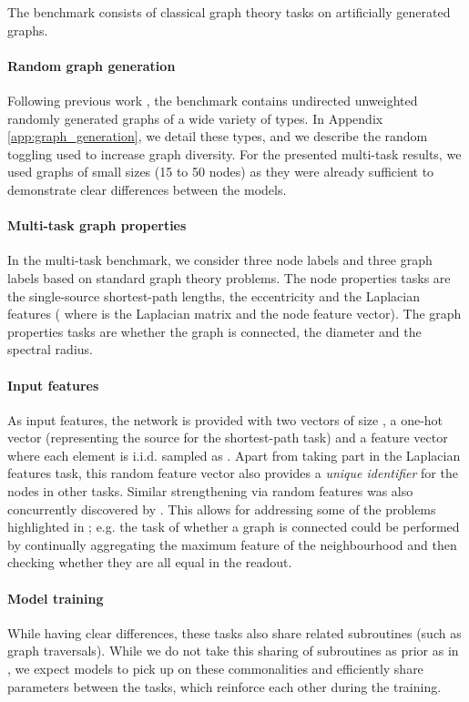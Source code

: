 \documentclass{article}
\begin{document}
The benchmark consists of classical graph theory tasks on artificially generated graphs.

\paragraph{Random graph generation}

Following previous work \cite{velickovic2019neural,you2019positionaware}, the benchmark contains undirected unweighted randomly generated graphs of a wide variety of types. In Appendix \ref{app:graph_generation}, we detail these types, and we describe the random toggling used to increase graph diversity. For the presented multi-task results, we used graphs of small sizes (15 to 50 nodes) as they were already sufficient to demonstrate clear differences between the models.

\paragraph{Multi-task graph properties}
    \label{sub:multitask}
In the multi-task benchmark, we consider three node labels and three graph labels based on standard graph theory problems. The node properties tasks are the single-source shortest-path lengths, the eccentricity and the Laplacian features ( where  is the Laplacian matrix and  the node feature vector). The graph properties tasks are whether the graph is connected, the diameter and the spectral radius.

\paragraph{Input features} As input features, the network is provided with two vectors of size , a one-hot vector (representing the source for the shortest-path task) and a feature vector  where each element is i.i.d. sampled as . Apart from taking part in the Laplacian features task, this random feature vector also provides a \textit{unique identifier} for the nodes in other tasks. Similar strengthening via random features was also concurrently discovered by \cite{sato2020random}.
This allows for addressing some of the problems highlighted in \cite{garg2020generalization,chen2020can}; e.g. the task of whether a graph is connected could be performed by continually aggregating the maximum feature of the neighbourhood and then checking whether they are all equal in the readout.  


\paragraph{Model training}
While having clear differences, these tasks also share related subroutines (such as graph traversals). While we do not take this sharing of subroutines as prior as in \cite{velickovic2019neural}, we expect models to pick up on these commonalities and efficiently share parameters between the tasks, which reinforce each other during the training.
\end{document}
